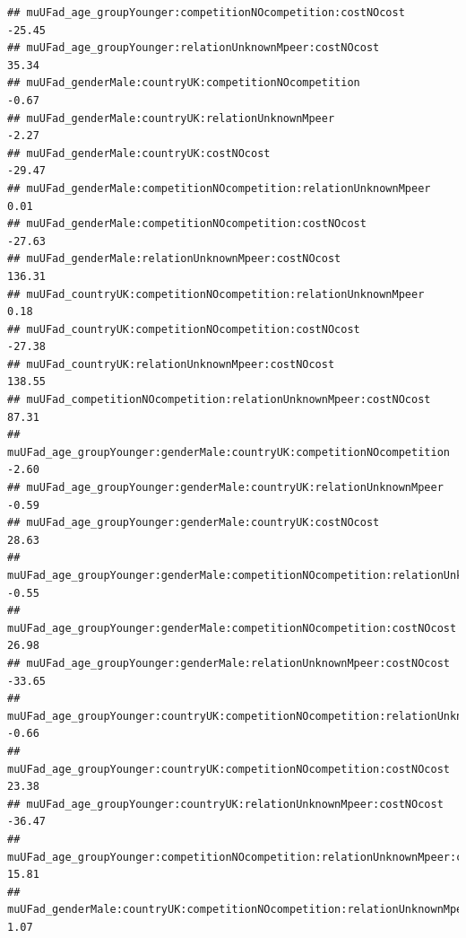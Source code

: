 \documentclass[
]{article}
\begin{document}
\begin{verbatim}
## muUFad_age_groupYounger:competitionNOcompetition:costNOcost                                              -25.45
## muUFad_age_groupYounger:relationUnknownMpeer:costNOcost                                                   35.34
## muUFad_genderMale:countryUK:competitionNOcompetition                                                      -0.67
## muUFad_genderMale:countryUK:relationUnknownMpeer                                                          -2.27
## muUFad_genderMale:countryUK:costNOcost                                                                   -29.47
## muUFad_genderMale:competitionNOcompetition:relationUnknownMpeer                                            0.01
## muUFad_genderMale:competitionNOcompetition:costNOcost                                                    -27.63
## muUFad_genderMale:relationUnknownMpeer:costNOcost                                                        136.31
## muUFad_countryUK:competitionNOcompetition:relationUnknownMpeer                                             0.18
## muUFad_countryUK:competitionNOcompetition:costNOcost                                                     -27.38
## muUFad_countryUK:relationUnknownMpeer:costNOcost                                                         138.55
## muUFad_competitionNOcompetition:relationUnknownMpeer:costNOcost                                           87.31
## muUFad_age_groupYounger:genderMale:countryUK:competitionNOcompetition                                     -2.60
## muUFad_age_groupYounger:genderMale:countryUK:relationUnknownMpeer                                         -0.59
## muUFad_age_groupYounger:genderMale:countryUK:costNOcost                                                   28.63
## muUFad_age_groupYounger:genderMale:competitionNOcompetition:relationUnknownMpeer                          -0.55
## muUFad_age_groupYounger:genderMale:competitionNOcompetition:costNOcost                                    26.98
## muUFad_age_groupYounger:genderMale:relationUnknownMpeer:costNOcost                                       -33.65
## muUFad_age_groupYounger:countryUK:competitionNOcompetition:relationUnknownMpeer                           -0.66
## muUFad_age_groupYounger:countryUK:competitionNOcompetition:costNOcost                                     23.38
## muUFad_age_groupYounger:countryUK:relationUnknownMpeer:costNOcost                                        -36.47
## muUFad_age_groupYounger:competitionNOcompetition:relationUnknownMpeer:costNOcost                          15.81
## muUFad_genderMale:countryUK:competitionNOcompetition:relationUnknownMpeer                                  1.07

\end{verbatim}
\end{document}
